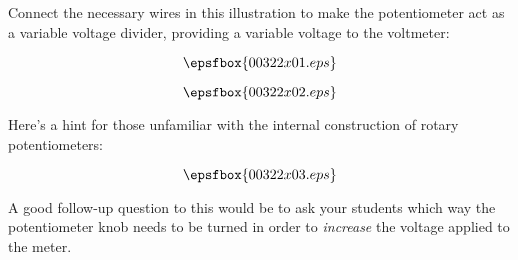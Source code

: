 

Connect the necessary wires in this illustration to make the potentiometer act as a variable voltage divider, providing a variable voltage to the voltmeter:

$$\epsfbox{00322x01.eps}$$







$$\epsfbox{00322x02.eps}$$

Here's a hint for those unfamiliar with the internal construction of rotary potentiometers:

$$\epsfbox{00322x03.eps}$$







A good follow-up question to this would be to ask your students which way the potentiometer knob needs to be turned in order to {\it increase} the voltage applied to the meter.




